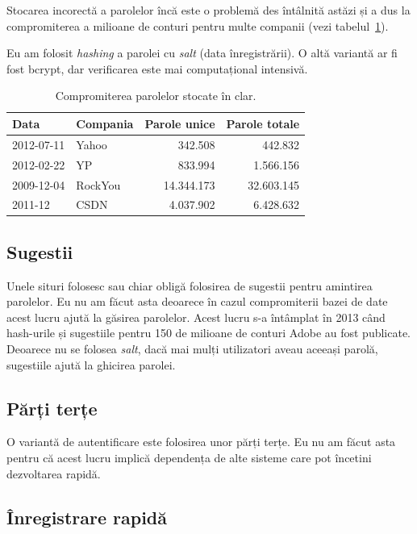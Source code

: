 \documentclass[a4wide,12pt]{report}
\newcommand{\eng}[1]{\emph{#1}} %
\begin{document}
Stocarea incorectă a parolelor încă este o problemă des întâlnită astăzi și a
dus la compromiterea a milioane de conturi pentru multe companii (vezi
tabelul~\ref{paroletab}).

Eu am folosit \eng{hashing} a parolei cu \eng{salt} (data înregistrării). O altă
variantă ar fi fost bcrypt, dar verificarea este mai computațional intensivă.

\begin{table}[hb]
\begin{center}
\begin{tabular}{l l r r}
Data & Compania & Parole unice & Parole totale \\
\hline
2012-07-11 & Yahoo & 342.508 & 442.832 \\
2012-02-22 & YP & 833.994 & 1.566.156 \\
2009-12-04 & RockYou & 14.344.173 & 32.603.145 \\
2011-12 & CSDN & 4.037.902 & 6.428.632 \\
\end{tabular}
\end{center}
\caption{Compromiterea parolelor stocate în clar\cite{passleak}.}
\label{paroletab}
\end{table}

\subsection{Sugestii}

Unele situri folosesc sau chiar obligă folosirea de sugestii pentru amintirea
parolelor. Eu nu am făcut asta deoarece în cazul compromiterii bazei de date
acest lucru ajută la găsirea parolelor. Acest lucru s-a întâmplat în 2013 când
hash-urile și sugestiile pentru 150 de milioane de conturi Adobe au fost
publicate. Deoarece nu se folosea \eng{salt}, dacă mai mulți utilizatori aveau
aceeași parolă, sugestiile ajută la ghicirea parolei.

\subsection{Părți terțe}

O variantă de autentificare este folosirea unor părți terțe. Eu nu am făcut asta
pentru că acest lucru implică dependența de alte sisteme care pot încetini
dezvoltarea rapidă.

\subsection{Înregistrare rapidă}
\label{inregrapsub}
\end{document}
